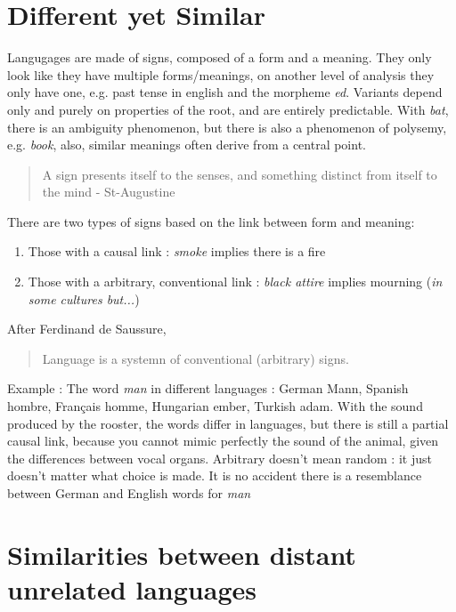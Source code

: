 \documentclass{cours}
\begin{document}
\section{Different yet Similar}
Langugages are made of signs, composed of a form and a meaning. They only look like they have multiple forms/meanings, on another level of analysis they only have one, e.g. past tense in english and the morpheme \textsl{ed}. Variants depend only and purely on properties of the root, and are entirely predictable. With \textsl{bat}, there is an ambiguity phenomenon, but there is also a phenomenon of polysemy, e.g. \textsl{book}, also, similar meanings often derive from a central point.
\begin{quote}
    A sign presents itself to the senses, and something distinct from itself to the mind  - St-Augustine
\end{quote}
There are two types of signs based on the link between form and meaning: 
\begin{enumerate}
    \item Those with a causal link : \textsl{smoke} implies there is a fire
    \item Those with a arbitrary, conventional link : \textsl{black attire} implies mourning (\textit{in some cultures but...})
\end{enumerate}
After Ferdinand de Saussure, \begin{quote}
    Language is a systemn of conventional (arbitrary) signs.    
\end{quote}
Example : The word \textsl{man} in different languages : German Mann, Spanish hombre, Français homme, Hungarian ember, Turkish adam. With the sound produced by the rooster, the words differ in languages, but there is still a partial causal link, because you cannot mimic perfectly the sound of the animal, given the differences between vocal organs. 
Arbitrary doesn't mean random : it just doesn't matter what choice is made. It is no accident there is a resemblance between German and English words for \textsl{man}

\section{Similarities between distant unrelated languages}
\end{document}
